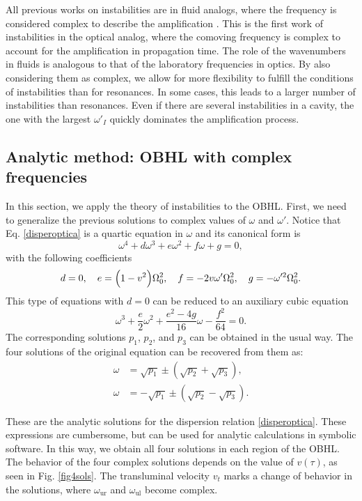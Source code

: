 \documentclass[aps,pra,reprint,amsmath,amssymb,showpacs,groupedaddress,floatfix]{revtex4-1}
\begin{document}
All previous works on instabilities are in fluid analogs, where the frequency is considered complex to describe the amplification \cite{zapata2011resonant,Macher2009pra, Coutant2010,Finazzi2010njp,Finazzi2015prl,2018Bermudez}. This is the first work of instabilities in the optical analog, where the comoving frequency is complex to account for the amplification in propagation time. The role of the wavenumbers in fluids is analogous to that of the laboratory frequencies in optics. By also considering them as complex, we allow for more flexibility to fulfill the conditions of instabilities than for resonances. In some cases, this leads to a larger number of instabilities than resonances. Even if there are several instabilities in a cavity, the one with the largest $\omega'_I$ quickly dominates the amplification process.

\subsection{Analytic method: OBHL with complex frequencies}
In this section, we apply the theory of instabilities to the OBHL. First, we need to generalize the previous solutions to complex values of $\omega$ and $\omega'$. Notice that Eq. \eqref{disperoptica} is a quartic equation in $\omega$ and its canonical form is
\begin{equation}
\omega^4+d\omega^3+e\omega^2+f\omega+g=0,
\end{equation}
with the following coefficients
\begin{equation}
d=0,\quad e=\Bigl(1-v^2\Bigr)\Omega_0^2,\quad f=-2v\omega' \Omega_0^2,\quad g=-\omega'^2\Omega_0^2.
\end{equation}
This type of equations with $d=0$ can be reduced to an auxiliary cubic equation
\begin{equation}
\omega^3+\frac{e}{2}\omega^2+\frac{e^2-4g}{16}\omega-\frac{f^2}{64}=0.
\end{equation}
The corresponding solutions $p_1$, $p_2$, and $p_3$ can be obtained in the usual way. The four solutions of the original equation can be recovered from them as:
\begin{subequations}\begin{align}
	\omega&=\sqrt{p_1}\pm(\sqrt{p_2}+\sqrt{p_3}),\\
	\omega&=-\sqrt{p_1}\pm(\sqrt{p_2}-\sqrt{p_3}).
	\end{align}\end{subequations}

These are the analytic solutions for the dispersion relation \eqref{disperoptica}. These expressions are cumbersome, but can be used for analytic calculations in symbolic software. In this way, we obtain all four solutions in each region of the OBHL. The behavior of the four complex solutions depends on the value of $v(\tau)$, as seen in Fig. \ref{fig4sols}. The transluminal velocity $v_t$ marks a change of behavior in the solutions, where $\omega_\text{ur}$ and $\omega_\text{ul}$ become complex.
\end{document}
